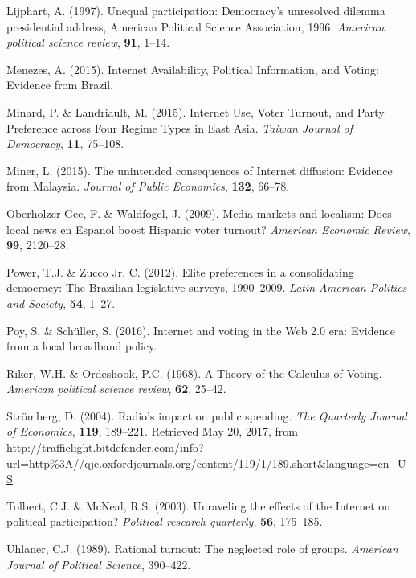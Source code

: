 \documentclass[12pt,]{article}
\begin{document}
\leavevmode\hypertarget{ref-lijphart_unequal_1997}{}%
Lijphart, A. (1997). Unequal participation: Democracy's unresolved
dilemma presidential address, American Political Science Association,
1996. \emph{American political science review}, \textbf{91}, 1--14.

\leavevmode\hypertarget{ref-menezes_internet_2015}{}%
Menezes, A. (2015). Internet Availability, Political Information, and
Voting: Evidence from Brazil.

\leavevmode\hypertarget{ref-minard_internet_2015}{}%
Minard, P. \& Landriault, M. (2015). Internet Use, Voter Turnout, and
Party Preference across Four Regime Types in East Asia. \emph{Taiwan
Journal of Democracy}, \textbf{11}, 75--108.

\leavevmode\hypertarget{ref-miner_unintended_2015}{}%
Miner, L. (2015). The unintended consequences of Internet diffusion:
Evidence from Malaysia. \emph{Journal of Public Economics},
\textbf{132}, 66--78.

\leavevmode\hypertarget{ref-oberholzer-gee_media_2009}{}%
Oberholzer-Gee, F. \& Waldfogel, J. (2009). Media markets and localism:
Does local news en Espanol boost Hispanic voter turnout? \emph{American
Economic Review}, \textbf{99}, 2120--28.

\leavevmode\hypertarget{ref-power_elite_2012}{}%
Power, T.J. \& Zucco Jr, C. (2012). Elite preferences in a consolidating
democracy: The Brazilian legislative surveys, 1990--2009. \emph{Latin
American Politics and Society}, \textbf{54}, 1--27.

\leavevmode\hypertarget{ref-poy_internet_2016}{}%
Poy, S. \& Schüller, S. (2016). Internet and voting in the Web 2.0 era:
Evidence from a local broadband policy.

\leavevmode\hypertarget{ref-riker_theory_1968}{}%
Riker, W.H. \& Ordeshook, P.C. (1968). A Theory of the Calculus of
Voting. \emph{American political science review}, \textbf{62}, 25--42.

\leavevmode\hypertarget{ref-stromberg_radios_2004}{}%
Strömberg, D. (2004). Radio's impact on public spending. \emph{The
Quarterly Journal of Economics}, \textbf{119}, 189--221. Retrieved May
20, 2017, from
\url{http://trafficlight.bitdefender.com/info?url=http\%3A//qje.oxfordjournals.org/content/119/1/189.short\&language=en_US}

\leavevmode\hypertarget{ref-tolbert_unraveling_2003}{}%
Tolbert, C.J. \& McNeal, R.S. (2003). Unraveling the effects of the
Internet on political participation? \emph{Political research
quarterly}, \textbf{56}, 175--185.

\leavevmode\hypertarget{ref-uhlaner_rational_1989}{}%
Uhlaner, C.J. (1989). Rational turnout: The neglected role of groups.
\emph{American Journal of Political Science}, 390--422.
\end{document}
